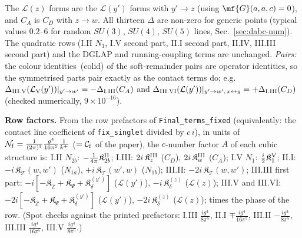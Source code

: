 The $\mathcal{L}(z)$ forms are the $\mathcal{L}(y')$ forms with $y'\to z$ (using $\mf{G}(a,a,c)=0$), and $C_{A}$ is $C_{D}$ with $z\to w$. All thirteen $\Delta$ are non-zero for generic points (typical values $0.2$--$6$ for random $SU(3)$, $SU(4)$, $SU(5)$ lines, Sec.~\ref{sec:dabc-num}). The quadratic rows (I.II $N_{1}$, I.V second part, II.I second part, II.IV, III.III second part) and the DGLAP and running-coupling terms are unchanged. \emph{Pairs:} the colour identities~(colid) of the soft-remainder pairs are operator identities, so the symmetrised parts pair exactly as the contact terms do; e.g.\ $\Delta_{\rm III.V}(\mathcal{L}_{\rm V}(y'))|_{y'\to w'}=-\Delta_{\rm I.III}(C_{A})$ and $\Delta_{\rm III.VI}(\mathcal{L}(y'))|_{y'\to w',\,x\leftrightarrow y}=+\Delta_{\rm I.III}(C_{D})$ (checked numerically, $9\times10^{-16}$).

\noindent\textbf{Row factors.} From the row prefactors of \texttt{Final\_terms\_fixed} (equivalently: the contact line coefficient of \texttt{fix\_singlet} divided by $c\,i$), in units of $\mathcal{N}_{\rm f}=\frac{1}{(2\pi)^{3}}\frac{g^{4}}{16\pi^{5}}\frac{1}{k^{+}}$ ($=\mathcal{C}_{\rm f}$ of the paper), the $c$-number factor $A$ of each cubic structure is: I.II $N_{2b}$: $-\frac{1}{4\pi}\mathfrak{K}^{\rm II}_{2b}$; I.III: $2i\,\mathfrak{K}^{\rm III}_{z}$ ($C_{D}$), $2i\,\mathfrak{K}^{\rm III}_{w}$ ($C_{A}$); I.V $N_{1}$: $\frac{i}{2}\mathfrak{K}^{\rm V}_{1}$; II.I: $-i\,\mathfrak{K}_{\mathcal{T}}(w,w')$ ($N_{1a}$), $+i\,\mathfrak{K}_{\mathcal{T}}(w',w)$ ($N_{1b}$); III.II: $-2i\,\mathfrak{K}_{\mathcal{T}}(w,w')$; III.III first part: $-i[-\mathfrak{K}_{\widehat{\mathcal{E}}}+\mathfrak{K}_{\Psi}+\mathfrak{K}^{(y')}_{\delta}]$ ($\mathcal{L}(y')$), $-i\,\mathfrak{K}^{(z)}_{\delta}$ ($\mathcal{L}(z)$); III.V and III.VI: $-2i[-\mathfrak{K}_{\widehat{\mathcal{E}}}+\mathfrak{K}_{\Psi}+\mathfrak{K}^{(y')}_{\delta}]$ ($\mathcal{L}(y')$), $-2i\,\mathfrak{K}^{(z)}_{\delta}$ ($\mathcal{L}(z)$); times the phase of the row. (Spot checks against the printed prefactors: I.III $\frac{ig^{4}}{8\pi^{5}}$, II.I $\mp\frac{ig^{4}}{16\pi^{5}}$, III.II $-\frac{ig^{4}}{8\pi^{5}}$, III.III $\frac{ig^{4}}{16\pi^{5}}$, III.V $\frac{ig^{4}}{8\pi^{5}}$.)

